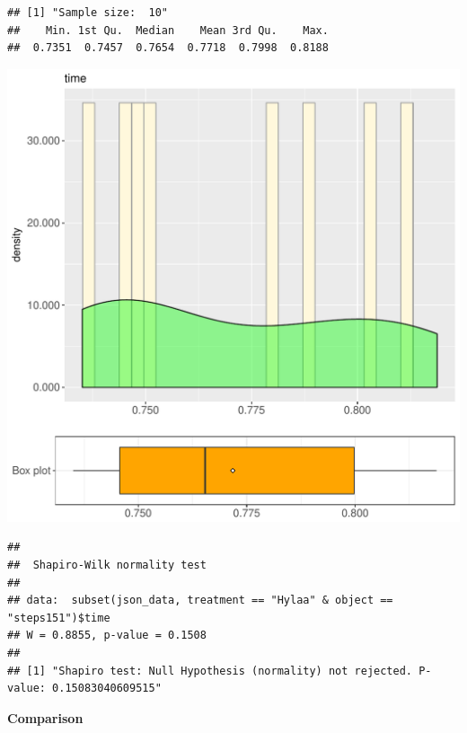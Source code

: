 \documentclass{article}\usepackage[]{graphicx}\usepackage[]{color}
\makeatletter
\def\maxwidth{ %
  \ifdim\Gin@nat@width>\linewidth
    \linewidth
  \else
    \Gin@nat@width
  \fi
}
\newenvironment{kframe}{%
 \def\at@end@of@kframe{}%
 \ifinner\ifhmode%
  \def\at@end@of@kframe{\end{minipage}}%
  \begin{minipage}{\columnwidth}%
 \fi\fi%
 \def\FrameCommand##1{\hskip\@totalleftmargin \hskip-\fboxsep
 \colorbox{shadecolor}{##1}\hskip-\fboxsep
     \hskip-\linewidth \hskip-\@totalleftmargin \hskip\columnwidth}%
 \MakeFramed {\advance\hsize-\width
   \@totalleftmargin\z@ \linewidth\hsize
   \@setminipage}}%
 {\par\unskip\endMakeFramed%
 \at@end@of@kframe}
\newenvironment{knitrout}{}{} %
\makeatother
\begin{document}
\begin{knitrout}
\color{fgcolor}\begin{kframe}
\begin{verbatim}
## [1] "Sample size:  10"
##    Min. 1st Qu.  Median    Mean 3rd Qu.    Max. 
##  0.7351  0.7457  0.7654  0.7718  0.7998  0.8188
\end{verbatim}
\end{kframe}
\includegraphics[width=\maxwidth]{figure/RH3_Hylaa_steps151-1} 
\begin{kframe}\begin{verbatim}
## 
## 	Shapiro-Wilk normality test
## 
## data:  subset(json_data, treatment == "Hylaa" & object == "steps151")$time
## W = 0.8855, p-value = 0.1508
## 
## [1] "Shapiro test: Null Hypothesis (normality) not rejected. P-value: 0.15083040609515"
\end{verbatim}
\end{kframe}
\end{knitrout}
  
 \textbf{Comparison}
  
\end{document}
